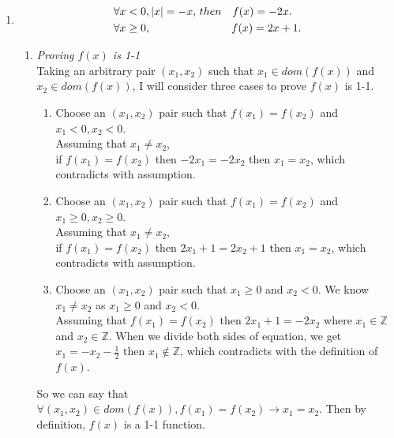 \documentclass[12pt]{article}
\begin{document}
\begin{enumerate}[label=(\alph*)]

\item 

	\begin{align*}
	&\forall x <    0,\, \abs{x}=-x,  \, then\quad f(x)=-2x.\\
	&\forall x \geq 0,\,\quad\quad\quad\quad\,\qquad\quad f(x)=2x+1.
	\end{align*}

	\begin{enumerate}[label=(\roman*)]

	\item \textit{Proving $f(x)$ is 1-1}\\

		Taking an arbitrary pair $(x_1, x_2)$ such that $x_1\in dom(f(x))$ and $x_2\in dom(f(x))$, I will consider three cases to prove $f(x)$ is 1-1.

		\begin{enumerate}[label=(\roman*)]

		\item Choose an $(x_1, x_2)$ pair such that $f(x_1)=f(x_2)$ and $x_1< 0, x_2< 0$.\\
		Assuming that $x_1\neq x_2$,\\
		if $f(x_1)=f(x_2)$ then $-2x_1=-2x_2$ then $x_1=x_2$, which contradicts with assumption.

		\item Choose an $(x_1, x_2)$ pair such that $f(x_1)=f(x_2)$ and $x_1\geq0, x_2\geq0$.\\
		Assuming that $x_1\neq x_2$,\\
		if $f(x_1)=f(x_2)$ then $2x_1+1=2x_2+1$ then $x_1=x_2$, which contradicts with assumption.

		\item Choose an $(x_1, x_2)$ pair such that $x_1\geq 0$ and $x_2< 0$. We know $x_1\neq x_2$ as $x_1\geq 0$ and $x_2< 0$.\\
		Assuming that $f(x_1)=f(x_2)$ then $2x_1+1=-2x_2$ where $x_1\in \mathbb{Z}$ and $x_2\in \mathbb{Z}$. When we divide both sides of equation, we get $x_1=-x_2-\frac{1}{2}$ then $x_1 \notin \mathbb{Z}$, which contradicts with the definition of $f(x)$.
		\end{enumerate}
		
		So we can say that $\forall(x_1, x_2) \in dom(f(x)), f(x_1)=f(x_2) \rightarrow x_1=x_2$.
		Then by definition, $f(x)$ is a 1-1 function.\\


\end{enumerate}
\end{enumerate}
\end{document}
